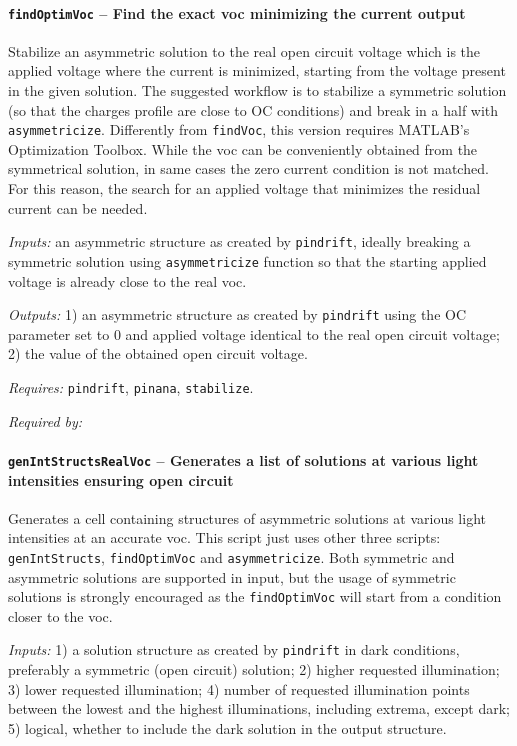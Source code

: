 		\paragraph{\texttt{findOptimVoc} -- Find the exact \gls{voc} minimizing the current output}
Stabilize an asymmetric solution to the real open circuit voltage
which is the applied voltage where the current is minimized,
starting from the voltage present in the given solution. The suggested
workflow is to stabilize a symmetric solution (so that the charges
profile are close to OC conditions) and break in a half with
\texttt{asymmetricize}.
Differently from \texttt{findVoc}, this version requires MATLAB's Optimization Toolbox.
While the \gls{voc} can be conveniently obtained from the symmetrical solution, in same cases the zero current condition is not matched.
For this reason, the search for an applied voltage that minimizes the residual current can be needed.
		
		\textit{Inputs:} an asymmetric structure as created by \texttt{pindrift}, ideally
    breaking a symmetric solution using \texttt{asymmetricize} function so that
    the starting applied voltage is already close to the real \gls{voc}.
    
\textit{Outputs:} 1) an asymmetric structure as created by \texttt{pindrift} using the OC
     parameter set to 0 and applied voltage identical to the real open
     circuit voltage;
2) the value of the obtained open circuit voltage.

\textit{Requires:} \texttt{pindrift}, \texttt{pinana}, \texttt{stabilize}.

\textit{Required by:} 

		\paragraph{\texttt{genIntStructsRealVoc} -- Generates a list of solutions at various light intensities ensuring open circuit}
		Generates a cell containing structures of asymmetric solutions at various light intensities at an accurate \gls{voc}.
		This script just uses other three scripts: \texttt{genIntStructs}, \texttt{findOptimVoc}
		 and \texttt{asymmetricize}. Both symmetric and asymmetric solutions are supported in input, but the usage of symmetric solutions is strongly encouraged as the \texttt{findOptimVoc} will start from a condition closer to the \gls{voc}.
		
				\textit{Inputs:} 1) a solution structure as created by \texttt{pindrift} in dark
				     conditions, preferably a symmetric (open circuit) solution;
				2) higher requested illumination;
				3) lower requested illumination;
				4) number of requested illumination points between the lowest and the highest illuminations, including extrema, except dark;
				5) logical, whether to include the dark solution in the output
				     structure.
				
